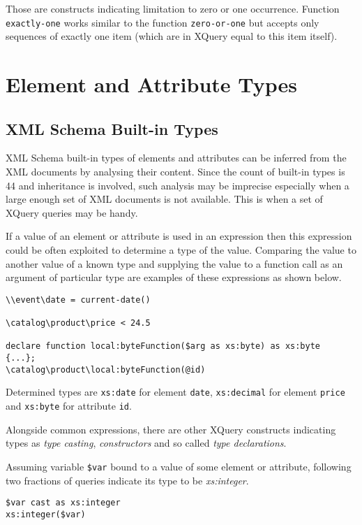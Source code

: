 Those are constructs indicating limitation to zero or one occurrence. Function \texttt{exactly-one} works similar to the function \texttt{zero-or-one} but accepts only sequences of exactly one item (which are in XQuery equal to this item itself).

\section{Element and Attribute Types}

\subsection{XML Schema Built-in Types}
XML Schema built-in types of elements and attributes can be inferred from the XML documents by analysing their content. Since the count of built-in types is 44 and inheritance is involved, such analysis may be imprecise especially when a large enough set of XML documents is not available.  This is when a set of XQuery queries may be handy.

If a value of an element or attribute is used in an expression then this expression could be often exploited to determine a type of the value. Comparing the value to another value of a known type and supplying the value to a function call as an argument of particular type are examples of these expressions as shown below.

\begin{verbatim}
\\event\date = current-date()

\catalog\product\price < 24.5

declare function local:byteFunction($arg as xs:byte) as xs:byte
{...};
\catalog\product\local:byteFunction(@id)
\end{verbatim}

Determined types are \texttt{xs:date} for element \texttt{date}, \texttt{xs:decimal} for element \texttt{price} and \texttt{xs:byte} for attribute \texttt{id}.

Alongside common expressions, there are other XQuery constructs indicating types as \emph{type casting}, \emph{constructors} and so called \emph{type declarations}.

Assuming variable \texttt{\$var} bound to a value of some element or attribute, following two fractions of queries indicate its type to be \emph{xs:integer}.

\begin{verbatim}
$var cast as xs:integer
xs:integer($var)
\end{verbatim}

